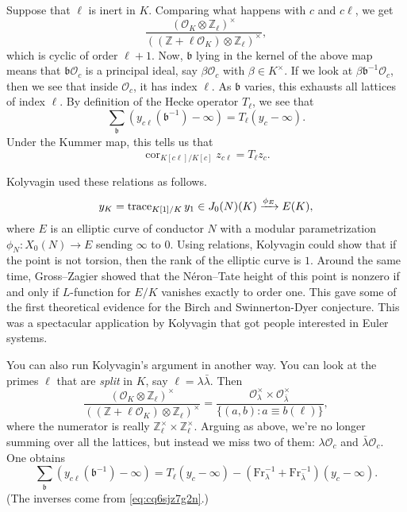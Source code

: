 \documentclass[reqno]{amsart} 
\begin{document}
Suppose that $\ell$ is inert in $K$.  Comparing what happens with $c$ and $c \ell$, we get
\begin{equation*}
  \frac{(\mathcal{O}_K \otimes \mathbb{Z}_{\ell})^\times}{((\mathbb{Z} + \ell \mathcal{O}_K) \otimes \mathbb{Z}_{\ell})^\times},
\end{equation*}
which is cyclic of order $\ell + 1$.  Now, $\mathfrak{b}$ lying in the kernel of the above map means that $\mathfrak{b} \mathcal{O}_c$ is a principal ideal, say $\beta \mathcal{O}_c$ with $\beta \in K^\times$.  If we look at $\beta \mathfrak{b}^{-1} \mathcal{O}_c$, then we see that inside $\mathcal{O}_c$, it has index $\ell$.  As $\mathfrak{b}$ varies, this exhausts all lattices of index $\ell$.  By definition of the Hecke operator $T_{\ell}$, we see that
\begin{equation*}
  \sum_{\mathfrak{b}} \left( y_{c \ell}(\mathfrak{b}^{-1}) - \infty \right) = T_{\ell}(y_c - \infty).
\end{equation*}
Under the Kummer map, this tells us that
\begin{equation*}
  \operatorname{cor}_{K[c \ell] / K[c]} z_{c \ell}
  = T_{\ell} z_c.  
\end{equation*}

Kolyvagin used these relations as follows.
\begin{equation*}
  y_K = \operatorname{trace}_{K[1] / K} y_1 \in J_0(N)(K) \xrightarrow{\phi_E} E(K),
\end{equation*}
where $E$ is an elliptic curve of conductor $N$ with a modular parametrization $\phi_N : X_0(N) \rightarrow E$ sending $\infty$ to $0$.  Using relations, Kolyvagin could show that if the point is not torsion, then the rank of the elliptic curve is $1$.  Around the same time, Gross--Zagier showed that the Néron--Tate height of this point is nonzero if and only if $L$-function for $E/K$ vanishes exactly to order one.  This gave some of the first theoretical evidence for the Birch and Swinnerton-Dyer conjecture.  This was a spectacular application by Kolyvagin that got people interested in Euler systems.

You can also run Kolyvagin's argument in another way.  You can look at the primes $\ell$ that are \emph{split} in $K$, say $\ell = \lambda \bar{\lambda}$.  Then
\begin{equation*}
  \frac{(\mathcal{O}_K \otimes \mathbb{Z}_{\ell})^\times}{((\mathbb{Z} + \ell \mathcal{O}_K) \otimes \mathbb{Z}_{\ell})^\times}
  =
  \frac{\mathcal{O}_\lambda^\times \times \mathcal{O}_{\bar{\lambda}}^\times}{\{(a, b) : a \equiv b(\ell)\}},
\end{equation*}
where the numerator is really $\mathbb{Z}_{\ell}^\times \times \mathbb{Z}_{\ell}^\times$.  Arguing as above, we're no longer summing over all the lattices, but instead we miss two of them: $\lambda \mathcal{O}_c$ and $\bar{\lambda} \mathcal{O}_c$.  One obtains
\begin{equation*}
  \sum_{\mathfrak{b}} (y_{c \ell}(\mathfrak{b}^{-1}) - \infty )
  =
  T_{\ell}(y_c - \infty)
  - (\mathrm{Fr}_\lambda^{-1} + \mathrm{Fr}_{\bar{\lambda}}^{-1})(y_c - \infty).
\end{equation*}
(The inverses come from \eqref{eq:cq6sjz7g2n}.)
\end{document}
